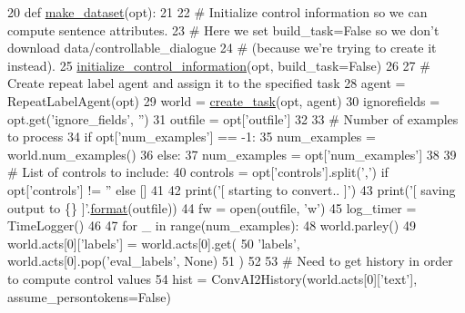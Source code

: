 \begin{DoxyCode}
20 \textcolor{keyword}{def }\hyperlink{namespaceprojects_1_1controllable__dialogue_1_1make__control__dataset_a8b209e575769f92c93ceb2c06e70fee1}{make\_dataset}(opt):
21 
22     \textcolor{comment}{# Initialize control information so we can compute sentence attributes.}
23     \textcolor{comment}{# Here we set build\_task=False so we don't download data/controllable\_dialogue}
24     \textcolor{comment}{# (because we're trying to create it instead).}
25     \hyperlink{namespaceprojects_1_1controllable__dialogue_1_1controllable__seq2seq_1_1controls_aafbe257df1791349439cc63c99de8b5e}{initialize\_control\_information}(opt, build\_task=\textcolor{keyword}{False})
26 
27     \textcolor{comment}{# Create repeat label agent and assign it to the specified task}
28     agent = RepeatLabelAgent(opt)
29     world = \hyperlink{namespaceparlai_1_1core_1_1worlds_a79969c7ba76d4b3c500f5bb776444dc6}{create\_task}(opt, agent)
30     ignorefields = opt.get(\textcolor{stringliteral}{'ignore\_fields'}, \textcolor{stringliteral}{''})
31     outfile = opt[\textcolor{stringliteral}{'outfile'}]
32 
33     \textcolor{comment}{# Number of examples to process}
34     \textcolor{keywordflow}{if} opt[\textcolor{stringliteral}{'num\_examples'}] == -1:
35         num\_examples = world.num\_examples()
36     \textcolor{keywordflow}{else}:
37         num\_examples = opt[\textcolor{stringliteral}{'num\_examples'}]
38 
39     \textcolor{comment}{# List of controls to include:}
40     controls = opt[\textcolor{stringliteral}{'controls'}].split(\textcolor{stringliteral}{','}) \textcolor{keywordflow}{if} opt[\textcolor{stringliteral}{'controls'}] != \textcolor{stringliteral}{''} \textcolor{keywordflow}{else} []
41 
42     print(\textcolor{stringliteral}{'[ starting to convert.. ]'})
43     print(\textcolor{stringliteral}{'[ saving output to \{\} ]'}.\hyperlink{namespaceparlai_1_1chat__service_1_1services_1_1messenger_1_1shared__utils_a32e2e2022b824fbaf80c747160b52a76}{format}(outfile))
44     fw = open(outfile, \textcolor{stringliteral}{'w'})
45     log\_timer = TimeLogger()
46 
47     \textcolor{keywordflow}{for} \_ \textcolor{keywordflow}{in} range(num\_examples):
48         world.parley()
49         world.acts[0][\textcolor{stringliteral}{'labels'}] = world.acts[0].get(
50             \textcolor{stringliteral}{'labels'}, world.acts[0].pop(\textcolor{stringliteral}{'eval\_labels'}, \textcolor{keywordtype}{None})
51         )
52 
53         \textcolor{comment}{# Need to get history in order to compute control values}
54         hist = ConvAI2History(world.acts[0][\textcolor{stringliteral}{'text'}], assume\_persontokens=\textcolor{keyword}{False})

\end{DoxyCode}
